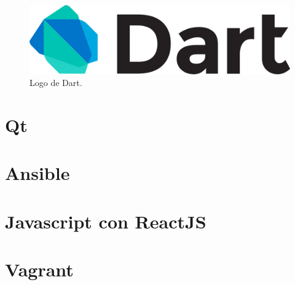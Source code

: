 \begin{figure}[H]
	\centering
	\includegraphics[width=0.50\linewidth]{imgs/dart-logo}
	\caption[Dart Logo]{Logo de Dart.}
	\label{fig:dart}
\end{figure}

\section{Qt}\label{sec:Qt}

\section{Ansible}\label{sec:ansible}

\section{Javascript con ReactJS}\label{sec:reactjs}

\section{Vagrant}\label{sec:vagrant}




